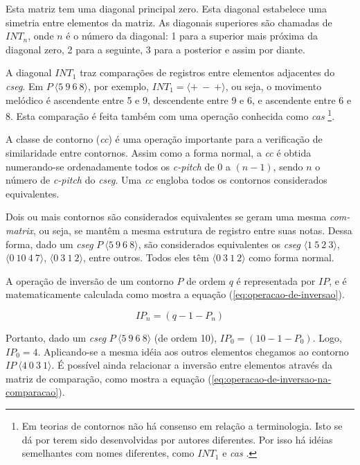\documentclass{article}
\newcommand{\termo}[1]{\textit{#1}}
\begin{document}
Esta matriz tem uma diagonal principal zero. Esta diagonal estabelece
uma simetria entre elementos da matriz. As diagonais superiores são
chamadas de $INT_n$, onde $n$ é o número da diagonal: 1 para a
superior mais próxima da diagonal zero, 2 para a seguinte, 3 para a
posterior e assim por diante.

A diagonal $INT_1$ traz comparações de registros entre elementos
adjacentes do \termo{cseg}. Em $P\:\langle5\:9\:6\:8\rangle$, por
exemplo, $INT_1=\langle+\:-\:+\rangle$, ou seja, o movimento melódico
é ascendente entre 5 e 9, descendente entre 9 e 6, e ascendente entre
6 e 8. Esta comparação é feita também com uma operação conhecida como
\termo{cas} \footnote{Em teorias de contornos não há consenso em
  relação a terminologia. Isto se dá por terem sido desenvolvidas por
  autores diferentes. Por isso há idéias semelhantes com nomes
  diferentes, como $INT_1$ e \termo{cas}
  \cite{friedmann87:response}.}.

A classe de contorno (\termo{cc}) é uma operação importante para a
verificação de similaridade entre contornos. Assim como a forma
normal, a \termo{cc} é obtida numerando-se ordenadamente todos os
\termo{c-pitch} de $0$ a $(n-1)$, sendo $n$ o número de
\termo{c-pitch} do \termo{cseg}. Uma \termo{cc} engloba todos os
contornos considerados equivalentes.

Dois ou mais contornos são considerados equivalentes se geram uma
mesma \termo{com-matrix}, ou seja, se mantêm a mesma estrutura de
registro entre suas notas. Dessa forma, dado um \termo{cseg}
$P\:\langle5\:9\:6\:8\rangle$, são considerados equivalentes os
\termo{cseg} $\langle1\:5\:2\:3\rangle$, $\langle0\:10\:4\:7\rangle$,
$\langle0\:3\:1\:2\rangle$, entre outros. Todos eles têm
$\langle0\:3\:1\:2\rangle$ como forma normal.

A operação de inversão de um contorno $P$ de ordem $q$ é representada
por $IP$, e é matematicamente calculada como mostra a equação
(\ref{eq:operacao-de-inversao}).

\begin{equation}
  \label{eq:operacao-de-inversao}
  IP_n=(q-1-P_n)
\end{equation}

Portanto, dado um \termo{cseg} $P\:\langle5\:9\:6\:8\rangle$ (de ordem
10), $IP_0=(10-1-P_0)$. Logo, $IP_0=4$. Aplicando-se a mesma idéia aos
outros elementos chegamos ao contorno
$IP\:\langle4\:0\:3\:1\rangle$. É possível ainda relacionar a inversão
entre elementos através da matriz de comparação, como mostra a equação
(\ref{eq:operacao-de-inversao-na-comparacao}).
\end{document}
